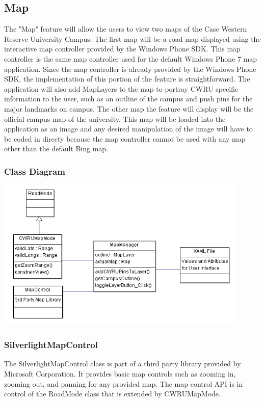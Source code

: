 \documentclass[pdftex,12pt,letter]{article}
\begin{document}
\subsection{Map}
The "Map" feature will allow the users to view two maps of the Case Western Reserve University Campus. The first map will be a road map displayed using the interactive map controller provided by the Windows Phone SDK. This map controller is the same map controller used for the default Windows Phone 7 map application. Since the map controller is already provided by the Windows Phone SDK, the implementation of this portion of the feature is straightforward. The application will also add MapLayers to the map to portray CWRU specific information to the user, such as an outline of the campus and push pins for the major landmarks on campus. The other map the feature will display will be the official campus map of the university.  This map will be loaded into the application as an image and any desired manipulation of the image will have to be coded in directy because the map controller cannot be used with any map other than the default Bing map.
\subsubsection{Class Diagram}
\includegraphics[width=120mm]{MapCD.png}
\subsubsection{SilverlightMapControl}
The SilverlightMapControl class is part of a third party library provided by Microsoft Corporation. It provides basic map controls such as zooming in, zooming out, and panning for any provided map. The map control API is in control of the RoadMode class that is extended by CWRUMapMode.
\end{document}
